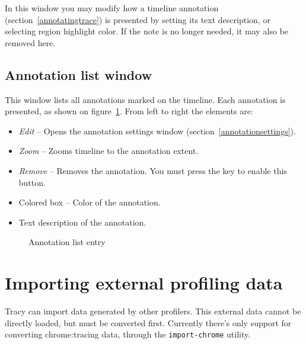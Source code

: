 \documentclass[hidelinks,titlepage,a4paper]{article}
\begin{document}
In this window you may modify how a timeline annotation (section~\ref{annotatingtrace}) is presented by setting its text description, or selecting region highlight color. If the note is no longer needed, it may also be removed here.

\subsection{Annotation list window}
\label{annotationlist}

This window lists all annotations marked on the timeline. Each annotation is presented, as shown on figure~\ref{figannlist}. From left to right the elements are:

\begin{itemize}
\item \emph{\faEdit{} Edit} -- Opens the annotation settings window (section~\ref{annotationsettings}).
\item \emph{\faMicroscope{} Zoom} -- Zooms timeline to the annotation extent.
\item \emph{\faTrash*{} Remove} -- Removes the annotation. You must press the \keys{\ctrl} key to enable this button.
\item Colored box -- Color of the annotation.
\item Text description of the annotation.
\end{itemize}

\begin{figure}[h]
\centering{}
\caption{Annotation list entry}
\label{figannlist}
\end{figure}

\section{Importing external profiling data}

Tracy can import data generated by other profilers. This external data cannot be directly loaded, but must be converted first. Currently there's only support for converting chrome:tracing data, through the \texttt{import-chrome} utility.
\end{document}
